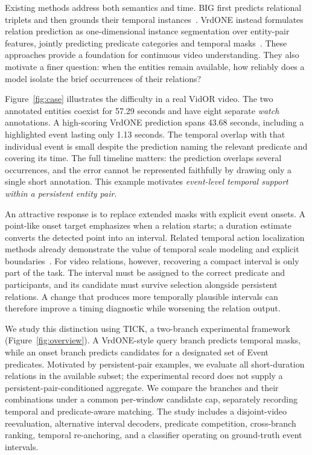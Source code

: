 \documentclass[10pt,twocolumn,letterpaper]{article}
\newcommand{\method}{TICK\xspace}
\begin{document}
Existing methods address both semantics and time. BIG first predicts relational triplets and then grounds their temporal instances~\cite{gao2022classification}. VrdONE instead formulates relation prediction as one-dimensional instance segmentation over entity-pair features, jointly predicting predicate categories and temporal masks~\cite{jiang2024vrdone}. These approaches provide a foundation for continuous video understanding. They also motivate a finer question: when the entities remain available, how reliably does a model isolate the brief occurrences of their relations?

Figure~\ref{fig:case} illustrates the difficulty in a real VidOR video. The two annotated entities coexist for 57.29 seconds and have eight separate \emph{watch} annotations. A high-scoring VrdONE prediction spans 43.68 seconds, including a highlighted event lasting only 1.13 seconds. The temporal overlap with that individual event is small despite the prediction naming the relevant predicate and covering its time. The full timeline matters: the prediction overlaps several occurrences, and the error cannot be represented faithfully by drawing only a single short annotation. This example motivates \emph{event-level temporal support within a persistent entity pair}.

An attractive response is to replace extended masks with explicit event onsets. A point-like onset target emphasizes when a relation starts; a duration estimate converts the detected point into an interval. Related temporal action localization methods already demonstrate the value of temporal scale modeling and explicit boundaries~\cite{zhao2021video,zhang2022actionformer,shi2023tridet}. For video relations, however, recovering a compact interval is only part of the task. The interval must be assigned to the correct predicate and participants, and its candidate must survive selection alongside persistent relations. A change that produces more temporally plausible intervals can therefore improve a timing diagnostic while worsening the relation output.

We study this distinction using \method, a two-branch experimental framework (Figure~\ref{fig:overview}). A VrdONE-style query branch predicts temporal masks, while an onset branch predicts candidates for a designated set of Event predicates. Motivated by persistent-pair examples, we evaluate all short-duration relations in the available subset; the experimental record does not supply a persistent-pair-conditioned aggregate. We compare the branches and their combinations under a common per-window candidate cap, separately recording temporal and predicate-aware matching. The study includes a disjoint-video reevaluation, alternative interval decoders, predicate competition, cross-branch ranking, temporal re-anchoring, and a classifier operating on ground-truth event intervals.
\end{document}
